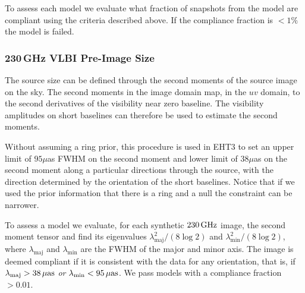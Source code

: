 To assess each model we evaluate what fraction of snapshots from the model are compliant using the criteria described above.
If the compliance fraction is $< 1\%$ the model is failed.


\subsubsection{230\,GHz VLBI Pre-Image Size}


The source size can be defined through the second moments of the source image on the sky.  The second moments in the image domain map, in the $uv$ domain, to the second derivatives of the visibility near zero baseline.  The visibility amplitudes on short baselines can therefore be used to estimate the second moments.


Without assuming a ring prior, this procedure is used in EHT3  to set an upper limit of $95\mu$as FWHM on the second moment and lower limit of $38\mu$as on the second moment along a particular directions through the source, with the direction determined by the orientation of the short baselines.  Notice that if we used the prior information that there is a ring and a null the constraint can be narrower.

To assess a model we evaluate, for each synthetic $230\,\mathrm{GHz}$ image, the second moment tensor and find its eigenvalues $\lambda_\mathrm{maj}^2/(8\log 2)$ and $\lambda_\mathrm{min}^2/(8\log 2)$, where $\lambda_\mathrm{maj}$ and $\lambda_\mathrm{min}$ are the FWHM of the major and minor axis.  The image is deemed compliant if it is consistent with the data for any orientation, that is, if $\lambda_\mathrm{maj} > 38\,\mathrm{\mu as}$ \emph{or} $\lambda_\mathrm{min} < 95\,\mathrm{\mu as}$.  We pass models with a compliance fraction $> 0.01$.

